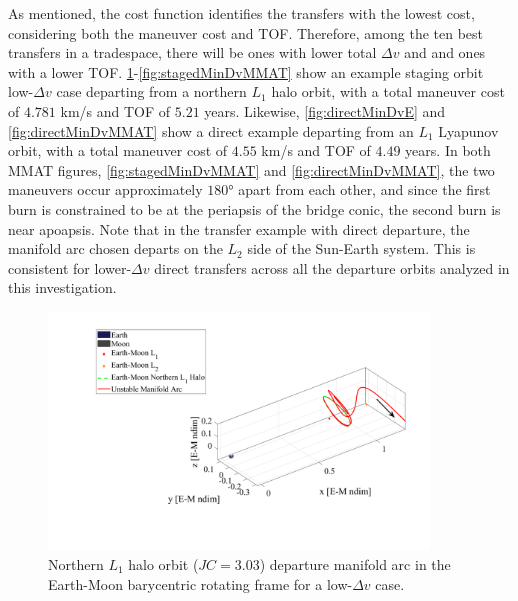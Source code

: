 As mentioned, the cost function identifies the transfers with the lowest cost, considering both the
maneuver cost and TOF. Therefore, among the ten best transfers in a tradespace, there will be ones
with lower total $\Delta v$ and and ones with a lower TOF.
\cref{fig:stagedMinDvEM}-\cref{fig:stagedMinDvMMAT} show an example staging orbit low-$\Delta v$
case departing from a northern $L_{1}$ halo orbit, with a total maneuver cost of $4.781$ km/s and
TOF of $5.21$ years. Likewise, \cref{fig:directMinDvE} and \cref{fig:directMinDvMMAT} show a direct
example departing from an $L_{1}$ Lyapunov orbit, with a total maneuver cost of $4.55$ km/s and TOF
of $4.49$ years. In both MMAT figures, \cref{fig:stagedMinDvMMAT} and \cref{fig:directMinDvMMAT},
the two maneuvers occur approximately $\ang{180}$ apart from each other, and since the first burn
is constrained to be at the periapsis of the bridge conic, the second burn is near apoapsis. Note
that in the transfer example with direct departure, the manifold arc chosen departs on the $L_{2}$
side of the Sun-Earth system. This is consistent for lower-$\Delta v$ direct transfers across all
the departure orbits analyzed in this investigation.

\begin{figure}[!htb]
    \centering
    \includegraphics[width=0.9\textwidth]{figures/StagedMinDvEM.pdf}
    \caption{Northern $L_{1}$ halo orbit ($JC=3.03$) departure manifold arc in the Earth-Moon barycentric rotating frame for a low-$\Delta v$ case.}
    \label{fig:stagedMinDvEM}
\end{figure}

